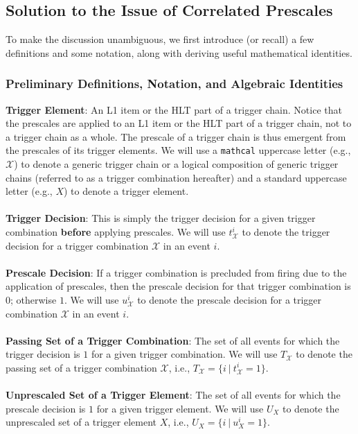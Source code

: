 \subsection{Solution to the Issue of Correlated Prescales}
\label{subsec:app-prw-math}
To make the discussion unambiguous, we first introduce (or recall) a few definitions and some notation, along with deriving useful mathematical identities.
\subsubsection{Preliminary Definitions, Notation, and Algebraic Identities}
\label{subsubsec:app-prw-math-defs-and-identities}
\textbf{Trigger Element}: An L1 item or the HLT part of a trigger chain. Notice that the prescales are applied to an L1 item or the HLT part of a trigger chain, not to a trigger chain as a whole. The prescale of a trigger chain is thus emergent from the prescales of its trigger elements. %
We will use a \texttt{mathcal} uppercase letter (e.g., $\mathcal{X}$) to denote a generic trigger chain or a logical composition of generic trigger chains (referred to as a trigger combination hereafter) and a standard uppercase letter (e.g., $X$) to denote a trigger element. %
\\\\
\textbf{Trigger Decision}: This is simply the trigger decision for a given trigger combination \textbf{before} applying prescales. We will use $t^i_\mathcal{X}$ to denote the trigger decision for a trigger combination $\mathcal{X}$ in an event $i$.\\\\
\textbf{Prescale Decision}: If a trigger combination is precluded from firing due to the application of prescales, then the prescale decision for that trigger combination is $0$; otherwise $1$. We will use $u_\mathcal{X}^i$ to denote the prescale decision for a trigger combination $\mathcal{X}$ in an event $i$.
\\\\
\textbf{Passing Set of a Trigger Combination}: The set of all events for which the trigger decision is $1$ for a given trigger combination. We will use $T_\mathcal{X}$ to denote the passing set of a trigger combination $\mathcal{X}$, i.e., $T_{\mathcal{X}}=\{i\ \vert\ t^i_\mathcal{X}=1\}$. \\\\
\textbf{Unprescaled Set of a Trigger Element}: The set of all events for which the prescale decision is $1$ for a given trigger element. We will use $U_X$ to denote the unprescaled set of a trigger element $X$, i.e., $U_X=\{i\ \vert \ u^i_X=1\}$.
